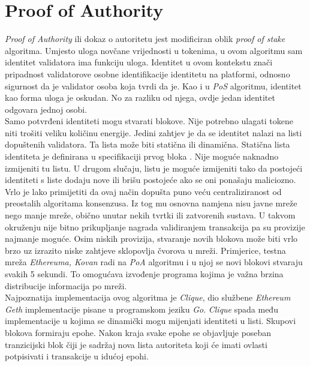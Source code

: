 \documentclass[times, utf8, zavrsni, numeric]{fer}
\begin{document}
\section{Proof of Authority}
\emph{Proof of Authority} ili dokaz o autoritetu jest modificiran oblik \emph{proof of stake} algoritma. Umjesto uloga novčane vrijednosti u tokenima, u ovom algoritmu
sam identitet validatora ima funkciju uloga. Identitet u ovom kontekstu znači pripadnost validatorove osobne identifikacije identitetu na platformi, odnosno
sigurnost da je validator osoba koja tvrdi da je. Kao i u \emph{PoS} algoritmu, identitet kao forma uloga je oskudan. No za razliku od njega, ovdje jedan identitet odgovara
jednoj osobi.\citep{poa1} \\
Samo potvrđeni identiteti mogu stvarati blokove. Nije potrebno ulagati tokene niti trošiti veliku količinu energije. Jedini zahtjev je da se identitet nalazi na listi
dopuštenih validatora. Ta lista može biti statična ili dinamična. Statična lista identiteta je definirana u specifikaciji prvog bloka . Nije moguće naknadno
izmijeniti tu listu. U drugom slučaju, listu je moguće izmijeniti tako da postojeći identiteti s liste dodaju nove ili brišu postojeće ako se oni ponašaju maliciozno.\citep{poa2} \\
Vrlo je lako primijetiti da ovaj način dopušta puno veću centraliziranost od preostalih algoritama konsenzusa. Iz tog mu osnovna namjena nisu javne mreže nego manje mreže,
obično unutar nekih tvrtki ili zatvorenih sustava. U takvom okruženju nije bitno prikupljanje nagrada validiranjem transakcija pa su provizije najmanje moguće.
Osim niskih provizija, stvaranje novih blokova može biti vrlo brzo uz izrazito niske zahtjeve sklopovlja čvorova u mreži. Primjerice, testna mreža \emph{Ethereuma, Kovan}
radi na \emph{PoA} algoritmu i u njoj se novi blokovi stvaraju svakih 5 sekundi. To omogućava izvođenje programa kojima je važna brzina distribucije informacija po mreži. \\
Najpoznatija implementacija ovog algoritma je \emph{Clique}, dio službene \emph{Ethereum Geth} implementacije pisane u programskom jeziku \emph{Go}.
\emph{Clique} spada među implementacije u kojima se dinamički mogu mijenjati identiteti u listi. Skupovi blokova formiraju epohe. Nakon kraja svake epohe se objavljuje
poseban tranzicijski blok čiji je sadržaj nova lista autoriteta koji će imati ovlasti potpisivati i transakcije u idućoj epohi.
\end{document}
